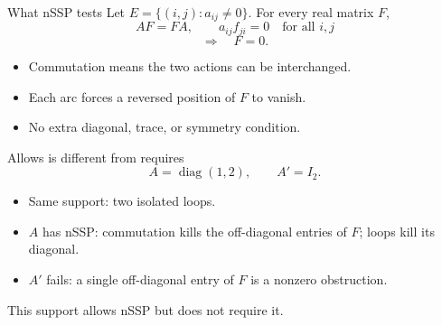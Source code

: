 \documentclass{beamer}
\begin{document}
\begin{frame}{What nSSP tests}
Let $E=\{(i,j):a_{ij}\ne0\}$. For every real matrix $F$,
\[
 AF=FA,\qquad a_{ij}f_{ji}=0\quad\text{for all }i,j
\]
\[
 \Longrightarrow\quad F=0.
\]
\begin{itemize}
\item Commutation means the two actions can be interchanged.
\item Each arc forces a reversed position of $F$ to vanish.
\item No extra diagonal, trace, or symmetry condition.
\end{itemize}
\end{frame}
\begin{frame}{Allows is different from requires}
\[
 A=\operatorname{diag}(1,2),\qquad A'=I_2.
\]
\begin{itemize}
\item Same support: two isolated loops.
\item $A$ has nSSP: commutation kills the off-diagonal entries of $F$; loops kill its diagonal.
\item $A'$ fails: a single off-diagonal entry of $F$ is a nonzero obstruction.
\end{itemize}
\alert{This support allows nSSP but does not require it.}
\end{frame}
\end{document}
